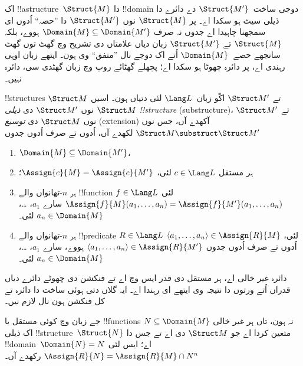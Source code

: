 \documentclass[../../../include/open-logic-section]{subfiles}
\begin{document}

اک !!a{structure}~$\Struct{M}$ دا !!{domain} دوجی ساخت~$\Struct{M'}$
دے دائرے دا ذیلی سیٹ ہو سکدا اے۔ پر $\Struct{M}$ نوں
$\Struct{M'}$ دا ”حصہ“ اُدوں ای سمجھنا چاہیدا اے جدوں نہ صرف
$\Domain{M}
\subseteq \Domain{M'}$ ہووے، بلکہ $\Struct{M}$ تے $\Struct{M'}$
زبان دیاں علامتاں دی تشریح وچ گھٹ توں گھٹ سانجھے حصے~$\Domain{M}$
اُتے اک دوجے نال ”متفق“ وی ہون۔
ایتھے زبان اوہی رہندی اے، پر دائرہ چھوٹا ہو سکدا اے؛
پچھلے گھٹائے روپ وچ زبان گھٹدی سی، دائرہ نہیں۔

\begin{defn}
!!{structure}s $\Struct M$ تے $\Struct M'$ اکّو زبان~$\Lang L$
لئی دتیاں ہون۔ اسیں $\Struct M$ نوں $\Struct M'$ دی
\emph{ذیلی !!{structure}} (substructure)، تے $\Struct M'$ نوں
$\Struct M$ دی \emph{توسیع} (extension) آکھدے آں، جس نوں
$\Struct M \substruct \Struct M'$ لکھدے آں، اُدوں تے صرف اُدوں جدوں
\begin{enumerate}
\item $\Domain{M} \subseteq \Domain{M'}$،
\item ہر مستقل $c \in \Lang L$ لئی، $\Assign{c}{M} =
    \Assign{c}{M'}$؛
\item ہر $n$-تھانواں والے !!{function} $f \in \Lang L$ لئی
  $\Assign{f}{M}(a_1, \dots, a_n) = \Assign{f}{M'}(a_1, \dots, a_n)$
  سارے $a_1$، \dots، $a_n \in \Domain{M}$ لئی۔
\item ہر $n$-تھانواں والے !!{predicate} $R \in \Lang L$ لئی، $\langle
  a_1, \dots, a_n\rangle \in \Assign{R}{M}$ اُدوں تے صرف اُدوں جدوں
  $\langle a_1, \dots,
  a_n\rangle \in \Assign{R}{M'}$ ہووے، سارے $a_1$، \dots، $a_n \in
  \Domain{M}$ لئی۔
\end{enumerate}
دائرہ غیر خالی اے، ہر مستقل دی قدر ایس وچ اے تے فنکشن دی چھوٹے
دائرے دیاں قدراں اُتے ورتوں دا نتیجہ وی ایتھے ای رہندا اے۔
ایہ گلاں دتی ہوئی ساخت دا دائرہ تے کل فنکشن ہون نال لازم نیں۔
\end{defn}

\begin{rem}
جے زبان وچ کوئی مستقل یا !!{function}s نہ ہون، تاں ہر غیر خالی $N
\subseteq \Domain{M}$ اک ذیلی !!{structure}~$\Struct{N}$
متعین کردا اے جو $\Struct M$ دی اے تے جس دا !!{domain}~$\Domain{N} = N$
اے؛ ایس لئی $\Assign{R}{N} =
\Assign{R}{M} \cap N^n$ رکھدے آں۔
\end{rem}

\end{document}
